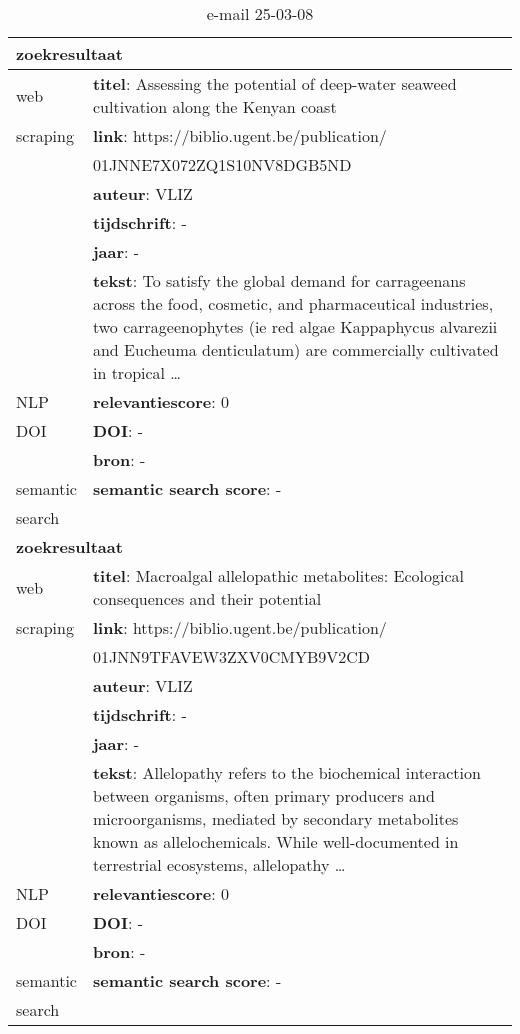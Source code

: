 \begin{table}[h!]
    \caption{e-mail 25-03-08}
    \centering
    \begin{tabularx}{\textwidth}{|p{4cm}|X|} 
        \hline
        \multicolumn{2}{|X|}{\textbf{zoekresultaat}} \\
        \hline
        web &\textbf{titel}:  Assessing the potential of deep-water seaweed cultivation along the Kenyan coast\\
        scraping&\textbf{link}: https://biblio.ugent.be/publication/\\&01JNNE7X072ZQ1S10NV8DGB5ND\\
        &\textbf{auteur}: VLIZ\\
        &\textbf{tijdschrift}: -\\
        &\textbf{jaar}: -\\
        &\textbf{tekst}: To satisfy the global demand for carrageenans across the food, cosmetic, and pharmaceutical industries, two carrageenophytes (ie red algae Kappaphycus alvarezii and Eucheuma denticulatum) are commercially cultivated in tropical …\\
        \hline
        NLP&\textbf{relevantiescore}: 0\\
        \hline
        DOI&\textbf{DOI}: -\\
        &\textbf{bron}: -\\
        \hline
        semantic&\textbf{semantic search score}: -\\
        search&\\
        \hline
        \multicolumn{2}{|X|}{\textbf{zoekresultaat}} \\
        \hline
        web &\textbf{titel}: Macroalgal allelopathic metabolites: Ecological consequences and their potential\\
        scraping&\textbf{link}: https://biblio.ugent.be/publication/\\&01JNN9TFAVEW3ZXV0CMYB9V2CD\\
        &\textbf{auteur}: VLIZ\\
        &\textbf{tijdschrift}: -\\
        &\textbf{jaar}: -\\
        &\textbf{tekst}: Allelopathy refers to the biochemical interaction between organisms, often primary producers and microorganisms, mediated by secondary metabolites known as allelochemicals. While well-documented in terrestrial ecosystems, allelopathy …\\
        \hline
        NLP&\textbf{relevantiescore}: 0\\
        \hline
        DOI&\textbf{DOI}: -\\
        &\textbf{bron}: -\\
        \hline
        semantic&\textbf{semantic search score}: -\\
        search&\\
        \hline
    \end{tabularx}
    \label{table:email20250308}
\end{table}
